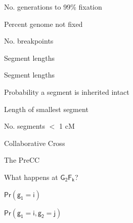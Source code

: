 \documentclass[aspectratio=169,12pt,t]{beamer}
\begin{document}
\begin{frame}[c]{No. generations to 99\% fixation}
\end{frame}

\begin{frame}[c]{Percent genome not fixed}
\end{frame}

\begin{frame}[c]{No. breakpoints}
\end{frame}

\begin{frame}[c]{Segment lengths}
\end{frame}

\begin{frame}[c]{Segment lengths}
\end{frame}

\begin{frame}[c]{Probability a segment is inherited intact}
\end{frame}

\begin{frame}[c]{Length of smallest segment}
\end{frame}

\begin{frame}[c]{No. segments $<$ 1 cM}
\end{frame}



\begin{frame}[c]{Collaborative Cross}


\end{frame}


\begin{frame}{The PreCC}


\vspace{5mm}

{\large What happens at $\mathsf{G_2 F_k}$?}

\bbi

\item[]  $\mathsf{Pr(g_1 = i)}$ \qquad{}

\item[]  $\mathsf{Pr(g_1 = i, g_2 = j)}$ 
\ei

\end{frame}
\end{document}
